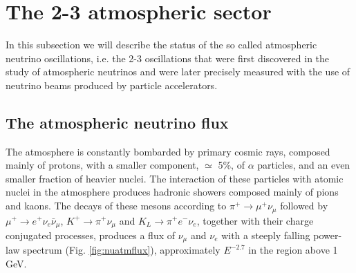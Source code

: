 \section{The 2-3 atmospheric sector }

In this subsection we will describe the status of the so called atmospheric neutrino oscillations, i.e. the 2-3 oscillations that were first discovered in the study of atmospheric neutrinos and were later precisely measured with the use of neutrino beams produced by particle accelerators.   


\subsection{The atmospheric neutrino flux}

The atmosphere is constantly bombarded by primary cosmic rays, composed mainly of protons, with a smaller component, $\simeq$ 5\%, of $\alpha$ particles, and an even smaller fraction of heavier nuclei. The interaction of these particles with atomic nuclei in the atmosphere produces hadronic showers composed mainly of pions and kaons. The decays of these mesons according to 
$\pi^+ \rightarrow \mu^+ \nu_\mu$ followed by 
$\mu^+ \rightarrow e^+ \nu_e \bar{\nu}_\mu $,
$K^+ \rightarrow \pi^+ \nu_\mu$ and $K_L \rightarrow \pi^+ e^- \nu_e$,
together with their charge conjugated processes, produces a flux of $\nu_\mu$ and $\nu_e$ with a steeply falling power-law spectrum (Fig. \ref{fig:nuatmflux}), approximately $E^{-2.7}$ in the region above 1 GeV.   



